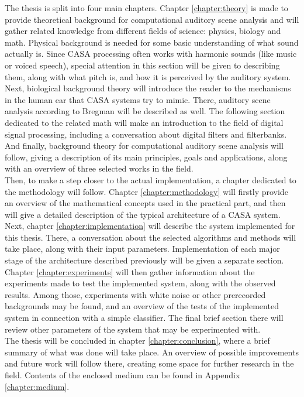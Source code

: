 The thesis is split into four main chapters. Chapter \ref{chapter:theory} is made to provide theoretical background for computational auditory scene analysis and will gather related knowledge from dif\-fer\-ent fields of science: physics, biology and math. Physical background is needed for some basic understanding of what sound actually is. Since CASA processing often works with harmonic sounds (like music or voiced speech), special attention in this section will be given to describing them, along with what pitch is, and how it is perceived by the auditory system. Next, biological background theory will introduce the reader to the mechanisms in the human ear that CASA systems try to mimic. There, auditory scene analysis according to Bregman will be described as well. The following section dedicated to the related math will make an introduction to the field of digital signal processing, including a conversation about digital filters and filterbanks. And finally, background theory for computational auditory scene analysis will follow, giving a description of its main principles, goals and applications, along with an overview of three selected works in the field.\\

Then, to make a step closer to the actual implementation, a chapter dedicated to the methodology will follow. Chapter \ref{chapter:methodology} will firstly provide an overview of the mathematical concepts used in the practical part, and then will give a detailed description of the typical architecture of a CASA system.\\

Next, chapter \ref{chapter:implementation} will describe the system implemented for this thesis. There, a conversation about the selected algorithms and methods will take place, along with their input parameters. Implementation of each major stage of the architecture described previously will be given a separate section.\\

Chapter \ref{chapter:experiments} will then gather information about the experiments made to test the implemented system, along with the observed results. Among those, experiments with white noise or other prerecorded backgrounds may be found, and an overview of the tests of the implemented system in connection with a simple classifier. The final brief section there will review other parameters of the system that may be experimented with.\\

The thesis will be concluded in chapter \ref{chapter:conclusion}, where a brief summary of what was done will take place. An overview of possible improvements and future work will follow there, creating some space for further research in the field. Contents of the enclosed medium can be found in Appendix \ref{chapter:medium}.\\
